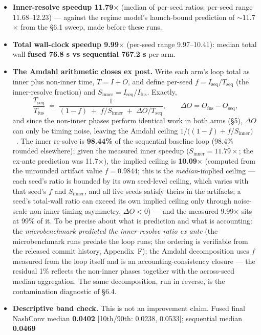 \documentclass[11pt]{article}
\begin{document}
\begin{itemize}
\item \textbf{Inner-resolve speedup 11.79$\times$} (median of per-seed ratios; per-seed
range 11.68--12.23) --- against the regime model's launch-bound prediction of
$\sim$11.7$\times$ from the \S6.1 sweep, made before these runs.
\item \textbf{Total wall-clock speedup 9.99$\times$} (per-seed range 9.97--10.41):
median total wall \textbf{fused 76.8 s vs sequential 767.2 s} per arm.
\item \textbf{The Amdahl arithmetic closes ex post.} Write each arm's loop total as
inner plus non-inner time, $T = I + O$, and define per-seed $f =
I_{\text{seq}}/T_{\text{seq}}$ (the inner-resolve fraction) and $S_{\text{inner}} =
I_{\text{seq}}/I_{\text{fus}}$. Exactly,
\[ \frac{T_{\text{seq}}}{T_{\text{fus}}} \;=\; \frac{1}{(1-f) \;+\; f/S_{\text{inner}}
\;+\; \Delta O/T_{\text{seq}}}, \qquad \Delta O = O_{\text{fus}} - O_{\text{seq}}, \]
and since the non-inner phases perform identical work in both arms (\S5), $\Delta O$ can
only be timing noise, leaving the Amdahl ceiling $1/\big((1-f) +
f/S_{\text{inner}}\big)$~\citep{Amdahl1967}. The inner re-solve is \textbf{98.44\%} of
the sequential baseline loop (98.4\% rounded elsewhere); given the measured inner
speedup ($S_{\text{inner}} = 11.79\times$; the ex-ante prediction was 11.7$\times$), the
implied ceiling is \textbf{10.09$\times$} (computed from the unrounded artifact value $f
= 0.9844$; this is the \emph{median}-implied ceiling --- each seed's ratio is bounded by
its own seed-level ceiling, which varies with that seed's $f$ and $S_{\text{inner}}$,
and all five seeds satisfy theirs in the artifacts; a seed's total-wall ratio can exceed
its own implied ceiling only through noise-scale non-inner timing asymmetry, $\Delta O <
0$) --- and the measured 9.99$\times$ sits at 99\% of it. To be precise about what is
prediction and what is accounting: the \emph{microbenchmark predicted the inner-resolve
ratio ex ante} (the microbenchmark runs predate the loop runs; the ordering is
verifiable from the released commit history, Appendix~F); the Amdahl decomposition uses
$f$ measured from the loop itself and is an accounting-consistency closure --- the
residual 1\% reflects the non-inner phases together with the across-seed median
aggregation. The same decomposition, run in reverse, is the contamination diagnostic of
\S6.4.
\item \textbf{Descriptive band check.} This is not an improvement claim. Fused final
NashConv median \textbf{0.0402} [10th/90th: 0.0238, 0.0533]; sequential median \textbf{0.0469}

\end{itemize}
\end{document}
